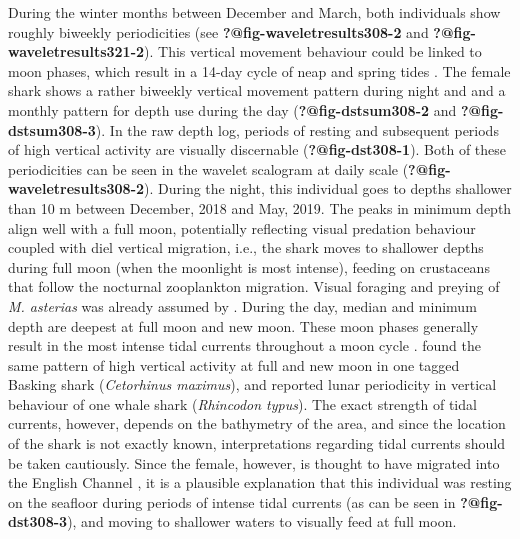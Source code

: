 \documentclass[
  authoryear,
  review,
  3p]{elsarticle}
\begin{document}
During the winter months between December and March, both individuals
show roughly biweekly periodicities (see
\textbf{?@fig-waveletresults308-2} and
\textbf{?@fig-waveletresults321-2}). This vertical movement behaviour
could be linked to moon phases, which result in a 14-day cycle of neap
and spring tides \citep{shepard_2006}. The female shark shows a rather
biweekly vertical movement pattern during night and and a monthly
pattern for depth use during the day (\textbf{?@fig-dstsum308-2} and
\textbf{?@fig-dstsum308-3}). In the raw depth log, periods of resting
and subsequent periods of high vertical activity are visually
discernable (\textbf{?@fig-dst308-1}). Both of these periodicities can
be seen in the wavelet scalogram at daily scale
(\textbf{?@fig-waveletresults308-2}). During the night, this individual
goes to depths shallower than 10 m between December, 2018 and May, 2019.
The peaks in minimum depth align well with a full moon, potentially
reflecting visual predation behaviour coupled with diel vertical
migration, i.e., the shark moves to shallower depths during full moon
(when the moonlight is most intense), feeding on crustaceans that follow
the nocturnal zooplankton migration. Visual foraging and preying of
\emph{M. asterias} was already assumed by \citet{griffiths_2020}. During
the day, median and minimum depth are deepest at full moon and new moon.
These moon phases generally result in the most intense tidal currents
throughout a moon cycle \citep{arnold_1994}. \citet{shepard_2006} found
the same pattern of high vertical activity at full and new moon in one
tagged Basking shark (\emph{Cetorhinus maximus}), and
\citet{graham_2006} reported lunar periodicity in vertical behaviour of
one whale shark (\emph{Rhincodon typus}). The exact strength of tidal
currents, however, depends on the bathymetry of the area, and since the
location of the shark is not exactly known, interpretations regarding
tidal currents should be taken cautiously. Since the female, however, is
thought to have migrated into the English Channel \citep[an area with
exceptionally high tidal currents,][]{salomon_1993}, it is a plausible
explanation that this individual was resting on the seafloor during
periods of intense tidal currents (as can be seen in
\textbf{?@fig-dst308-3}), and moving to shallower waters to visually
feed at full moon.
\end{document}
